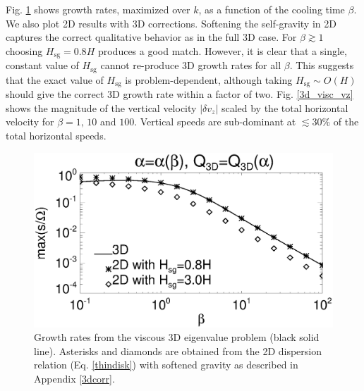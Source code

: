 Fig. \ref{3d_visc} shows growth rates, maximized over $k$, as a
function of the cooling time $\beta$. We also plot 2D results with 3D
corrections. Softening the self-gravity in 2D captures the correct 
qualitative behavior as in the full 3D case. For $\beta\gtrsim 1$
choosing $H_\mathrm{sg}=0.8H$ produces a good match. However, it is
clear that a single, constant value of $H_\mathrm{sg}$ cannot
re-produce 3D growth rates for all $\beta$. This suggests that the
exact value of $H_\mathrm{sg}$ is problem-dependent, although taking 
$H_\mathrm{sg}\sim O(H)$ should give the correct 3D growth rate within 
a factor of two. 
Fig. \ref{3d_visc_vz} shows the magnitude of the vertical velocity
$|\delta v_z|$ scaled by the total horizontal velocity for $\beta =
1,\,10$ and $100$. Vertical speeds are sub-dominant at $\lesssim 30\%$
of the total horizontal speeds. 

\begin{figure}
  \includegraphics[width=\linewidth,clip=true,trim=0cm 0.cm 0.cm
    0.0cm]{figures/growth_visc3d}
  \caption{Growth rates from the viscous 3D eigenvalue problem (black solid
    line). Asterisks and diamonds are obtained from the 2D dispersion
    relation (Eq. \ref{thindisk}) with softened gravity as described
    in Appendix \ref{3dcorr}. \label{3d_visc}} 
\end{figure}



